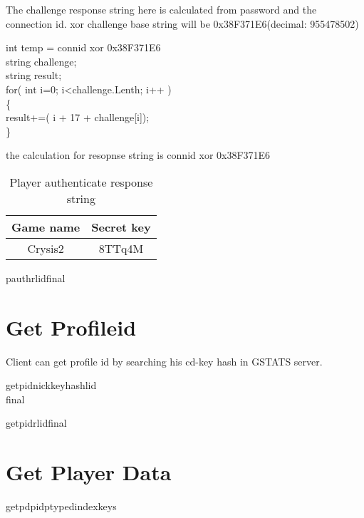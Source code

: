 \documentclass[oneside,titlepage,a4paper]{Definition/retrospy} %
\begin{document}
The challenge response string here is calculated from password and the connection id.
xor challenge base string will be 0x38F371E6(decimal: 955478502)
\begin{mybox}
int temp = connid xor 0x38F371E6\\
string challenge;\\
string result;\\
for( int i=0; i<challenge.Lenth; i++ )\\
\{\\
	result+=( i + 17 + challenge[i]);\\
\}
\end{mybox}
the calculation for resopnse string is connid xor 0x38F371E6
\begin{table}[H]
	\centering
	\begin{tabular}{|c|c|}
		\hline
		\textbf{Game name}&\textbf{Secret key}\\\hline
		Crysis2&8TTq4M\\\hline
	\end{tabular}
	\caption{Player authenticate response string}
	\label{Player authenticate response string}
\end{table}

\ServerResponse

\begin{mybox}[label = gstats player auth server response]
	\tbs pauthr\tbs <profile id>\tbs lid\tbs <local id>\tbs final\tbs
\end{mybox}



\section{Get Profileid}
Client can get profile id by searching his cd-key hash in GSTATS server.
\ClientRequest
\begin{mybox}
	\tbs getpid\tbs\tbs nick\tbs <nick name>\tbs keyhash\tbs<cd key hash>\tbs lid\tbs <local id>\\\tbs final\tbs
\end{mybox}

\ServerResponse

\begin{mybox}
	\tbs getpidr\tbs <profile id>\tbs lid\tbs<local id>\tbs final\tbs
\end{mybox}

\section{Get Player Data}
\ClientRequest
\begin{mybox}
	\tbs getpd\tbs\tbs pid\tbs<profile id>\tbs ptype\tbs<persist storage type>\tbs dindex\tbs <data index>\tbs keys
\end{mybox}
\ServerResponse
\end{document}
